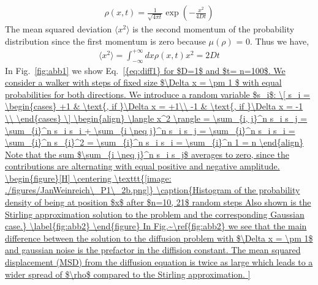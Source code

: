 \documentclass[12pt]{article}
\begin{document}
\begin{align}
    \rho (x, t) = \frac{1}{\sqrt{4 \pi t}} \exp{   \left( -\frac{x^2}{4Dt} \right) }
\end{align}  
The mean squared deviation $  \langle x^2 \rangle $ is the second momentum of the 
probability distribution since the first momentum is zero because $\mu(\rho)$ = 0.
Thus we have,
\begin{align}
  \langle x^2 \rangle = \int_{-\infty}^{+\infty} dx \rho (x, t) x^2 = 2 Dt
  \label{eq:diff1}
\end{align}
In Fig.~\ref{fig:abb1} we show Eq.~\ref{{eq:diff1} for $D=1$ and $t= n=100$.





We consider a walker with steps of fixed size $\Delta x = \pm 1 $ with equal probabilities for  both directions.
We introduce a random variable $s_i$:
\[   
s_i = 
     \begin{cases}
       +1 & \text{, if }\Delta x = +1\\
       -1 & \text{, if }\Delta x = -1 \\
     \end{cases}
\]



\begin{align}
  \langle x^2 \rangle  = \sum_{i, j}^n s_i s_j = \sum_{i}^n s_i s_i  + \sum_{i \neq j}^n s_i s_j
  = \sum_{i}^n s_i s_i  = \sum_{i}^n s_{i}^2 = \sum_{i}^n s_i s_i  = \sum_{i}^n 1 = n  
\end{align}
Note that the sum $\sum_{i \neq j}^n s_i s_j$ averages to zero, since the contributions are alternating with
equal positive and negative amplitude.




\begin{figure}[H]
  \centering
    \texttt{[image: ./figures/JanWeinreich\_P1\_2b.png]}
    \caption{Histogram of the probability density of being at position $x$ after $n=10, 21$ random steps
            Also shown is the Stirling approximation solution to the problem and the corresponding 
            Gaussian case.}
    \label{fig:abb2}
  \end{figure}






In Fig.~\ref{fig:abb2} we see that the main difference between the solution to the diffusion
problem with $\Delta x = \pm 1$ and gaussian noise is the prefactor in the diffision constant.
The mean squared displacement (MSD) from the diffusion equation is twice as large which leads to
a wider spread of $\rho$ compared to the Stirling approximation.

}
\end{document}
